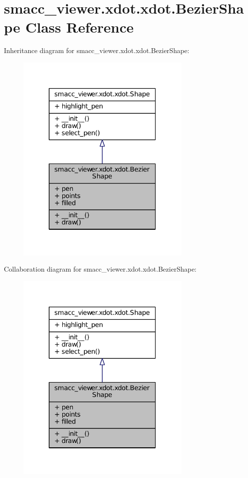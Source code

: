 \hypertarget{classsmacc__viewer_1_1xdot_1_1xdot_1_1BezierShape}{}\section{smacc\+\_\+viewer.\+xdot.\+xdot.\+Bezier\+Shape Class Reference}
\label{classsmacc__viewer_1_1xdot_1_1xdot_1_1BezierShape}


Inheritance diagram for smacc\+\_\+viewer.\+xdot.\+xdot.\+Bezier\+Shape\+:
\nopagebreak
\begin{figure}[H]
\begin{center}
\leavevmode
\includegraphics[width=244pt]{classsmacc__viewer_1_1xdot_1_1xdot_1_1BezierShape__inherit__graph}
\end{center}
\end{figure}


Collaboration diagram for smacc\+\_\+viewer.\+xdot.\+xdot.\+Bezier\+Shape\+:
\nopagebreak
\begin{figure}[H]
\begin{center}
\leavevmode
\includegraphics[width=244pt]{classsmacc__viewer_1_1xdot_1_1xdot_1_1BezierShape__coll__graph}
\end{center}
\end{figure}
